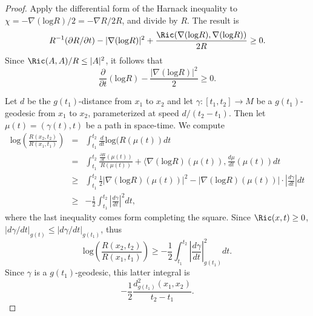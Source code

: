 \begin{proof}
Apply the differential form of the Harnack inequality to
$\chi=-\nabla(\mathrm{log} R)/2=-\nabla R/2R$, and divide by $R$. The
result is
$$R^{-1}(\partial R/\partial t)-|\nabla (\mathrm{log} R)|^2+\frac{\Ric(\nabla(\mathrm{log} R),\nabla(\mathrm{log} R))}{2R}\ge 0.$$ Since $\Ric(A,A)/R\le |A|^2$, it follows
that
$$\frac{\partial}{\partial t}(\mathrm{log} R)-\frac{|\nabla(\mathrm{log} R)|^2}{2}\ge 0.$$

Let $d$ be the $g(t_1)$-distance from $x_1$ to $x_2$ and let
 $\gamma\colon [t_1,t_2]\to M$ be a $g(t_1)$-geodesic from $x_1$
 to $x_2$, parameterized at speed $d/(t_2-t_1)$. Then
 let $\mu(t)=(\gamma(t),t)$ be a path in space-time.
 We compute
 \begin{eqnarray*}
 \mathrm{log}\left(\frac{R(x_2,t_2)}{R(x_1,t_1)}\right) & = & \int_{t_1}^{t_2}
 \frac{d}{dt}\mathrm{log}(R(\mu(t))dt \\
 & = & \int_{t_1}^{t_2}\frac{\frac{\partial R}{\partial t}(\mu(t))}{R(\mu(t))}+\langle\nabla(\mathrm{log} R)(\mu(t)),\frac{d\mu}{dt}(\mu(t))dt \\
 & \ge & \int_{t_1}^{t_2}\frac{1}{2}|\nabla (\mathrm{log} R)(\mu(t))|^2-|\nabla (\mathrm{log} R)(\mu(t))|\cdot \left|\frac{d\gamma}{dt}\right|dt \\
& \ge  & -\frac{1}{2}\int_{t_1}^{t_2}\left|\frac
{d\gamma}{dt}\right|^2dt,\end{eqnarray*} where the last inequality
comes form completing the square.
 Since $\Ric(x,t)\ge 0$,
$|d\gamma/dt|_{g(t)}\le |d\gamma/dt|_{g(t_1)}$, thus
$$\mathrm{log}\left(\frac{R(x_2,t_2)}{R(x_1,t_1)}\right)\ge
-\frac{1}{2}\int_{t_1}^{t_2}\left|\frac{d\gamma}{dt}\right|^2_{g(t_1)}dt.$$
Since $\gamma$ is a $g(t_1)$-geodesic, this latter integral is
$$-\frac {1}{2}\frac{d_{g(t_1)}^2(x_1,x_2)}{t_2-t_1}.$$
\end{proof}
